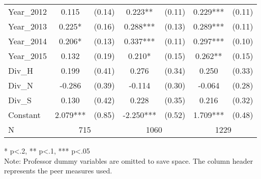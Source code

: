 \begin{sidewaystable}[!htbp]
\begin{threeparttable}
\begin{tabular}{l|c|c|c|c|c|c}
      Year\_2012 & 0.115                    & (0.14)                    & 0.223**   & (0.11) & 0.229***  & (0.11) \\
      Year\_2013 & 0.225*                   & (0.16)                    & 0.288***  & (0.13) & 0.289***  & (0.11) \\
      Year\_2014 & 0.206*                   & (0.13)                    & 0.337***  & (0.11) & 0.297***  & (0.10) \\
      Year\_2015 & 0.132                    & (0.19)                    & 0.210*    & (0.15) & 0.262**   & (0.15) \\
      Div\_H       & 0.199                    & (0.41)                    & 0.276     & (0.34) & 0.250     & (0.33) \\
      Div\_N       & -0.286                   & (0.39)                    & -0.114    & (0.30) & -0.064    & (0.28) \\
      Div\_S       & 0.130                    & (0.42)                    & 0.228     & (0.35) & 0.216     & (0.32) \\
      Constant          & 2.079***                 & (0.85)                    & -2.250*** & (0.52) & 1.709***  & (0.48) \\
      \hline
      N                 & \multicolumn{2}{|c}{715} & \multicolumn{2}{|c}{1060} & \multicolumn{2}{|c}{1229}               \\
      \hline
      \hline
    \end{tabular}
    \begin{tablenotes}
    \item{* p<.2, ** p<.1, *** p<.05 \\ Note: Professor dummy variables are omitted to save space. The column header represents the peer measures used.}
    \end{tablenotes}
  \end{threeparttable}
\end{sidewaystable}

\clearpage{}

\newpage{}

